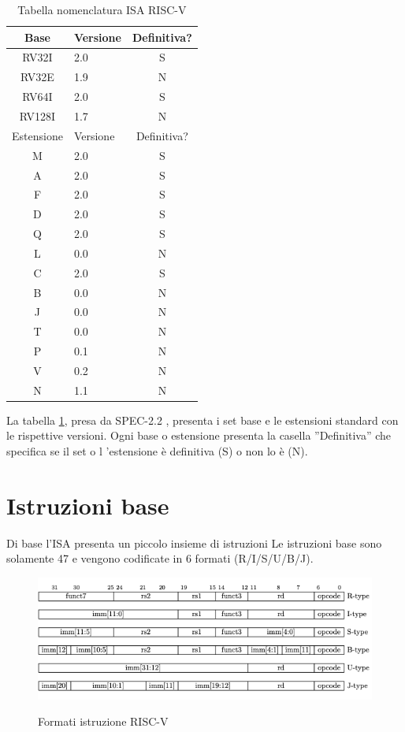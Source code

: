 \documentclass[12pt,a4paper]{report}
\begin{document}
\begin{table}
\centering
\begin{tabular}{|c|l|c|}
\hline
Base & Versione & Definitiva? \\
\hline
RV32I & 2.0 & S\\
RV32E & 1.9 & N\\
RV64I & 2.0 & S\\
RV128I & 1.7 & N\\
\hline
Estensione & Versione & Definitiva? \\
\hline
M & 2.0 & S\\
A & 2.0 & S\\
F & 2.0 & S\\
D & 2.0 & S\\
Q & 2.0 & S\\
L & 0.0 & N\\
C & 2.0 & S\\
B & 0.0 & N\\
J & 0.0 & N\\
T & 0.0 & N \\
P & 0.1 & N\\
V & 0.2 & N\\
N & 1.1 & N\\
\hline

\end{tabular}
	\caption{Tabella nomenclatura ISA RISC-V}
	\label{tab:nomenclaturaISA}
\end{table}

La tabella  \ref{tab:nomenclaturaISA}, presa da SPEC-2.2 \cite{ISA},  presenta i set base e le estensioni standard con le rispettive versioni. Ogni base o estensione presenta la casella ''Definitiva'' che specifica se il set o l 'estensione è definitiva (S) o non lo è (N).


\section{Istruzioni base}
Di base l'ISA presenta un piccolo insieme di istruzioni  Le istruzioni base sono solamente 47 e vengono codificate in 6 formati (R/I/S/U/B/J).  

\begin{figure}[h!]
	\includegraphics[width = \textwidth]{FormatiIstruzione.png}
	\caption{Formati istruzione RISC-V}
	\label{Fig:Formati_istruzioni_RV32I}
	\cite{ISA}
\end{figure}
\end{document}
